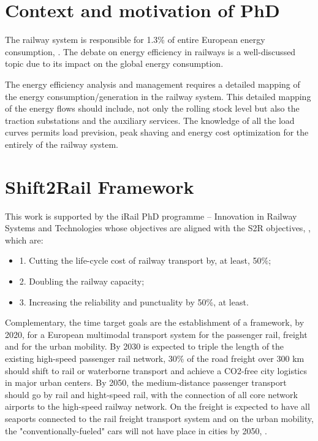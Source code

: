 
\section{Context and motivation of PhD}

The railway system is responsible for 1.3\% of entire European energy consumption, \cite{iea-uic2016}. 
The debate on energy efficiency in railways is a well-discussed topic due to its impact on the global energy consumption.

The energy efficiency analysis and management requires a detailed mapping of the energy consumption/generation in the railway system. 
This detailed mapping of the energy flows should include, not only the rolling stock level but also the traction substations and the auxiliary services.
The knowledge of all the load curves permits load prevision, peak shaving and energy cost optimization for the entirely of the railway system.


\section{Shift2Rail Framework}

This work is supported by the iRail PhD programme – Innovation in Railway Systems and Technologies whose objectives are aligned with the \ac{S2R} objectives, \cite{shift2rail2015}, which are: 

\begin{itemize}
	\setlength\itemsep{-0.5em}
	\item 1. Cutting the life-cycle cost of railway transport by, at least, 50\%;
	\item 2. Doubling the railway capacity;
	\item 3. Increasing the reliability and punctuality by 50\%, at least.
\end{itemize}

Complementary, the time target goals are the establishment of a framework, by 2020, for a European multimodal transport system for the passenger rail, freight and for the urban mobility. By 2030 is expected to triple the length of the existing high-speed passenger rail network, 30\% of the road freight over 300 km should shift to rail or waterborne transport and achieve a CO2-free city logistics in major urban centers. By 2050, the medium-distance passenger transport should go by rail and hight-speed rail, with the connection of all core network airports to the high-speed railway network. On the freight is expected to have all seaports connected to the rail freight transport system and on the urban mobility, the "conventionally-fueled" cars will not have place in cities by 2050, \cite{shift2rail2015}.


